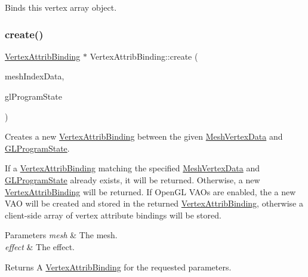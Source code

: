 Binds this vertex array object. \mbox{\label{classVertexAttribBinding_a9be9594764bc5cad1def711385dbb278}} 
\subsubsection{\texorpdfstring{create()}{create()}\hspace{0.1cm}{\footnotesize\ttfamily [1/2]}}
{\footnotesize\ttfamily \hyperlink{classVertexAttribBinding}{Vertex\+Attrib\+Binding} $\ast$ Vertex\+Attrib\+Binding\+::create (\begin{DoxyParamCaption}\item[{\hyperlink{classMeshIndexData}{Mesh\+Index\+Data} $\ast$}]{mesh\+Index\+Data,  }\item[{\hyperlink{classGLProgramState}{G\+L\+Program\+State} $\ast$}]{gl\+Program\+State }\end{DoxyParamCaption})\hspace{0.3cm}{\ttfamily [static]}}

Creates a new \hyperlink{classVertexAttribBinding}{Vertex\+Attrib\+Binding} between the given \hyperlink{classMeshVertexData}{Mesh\+Vertex\+Data} and \hyperlink{classGLProgramState}{G\+L\+Program\+State}.

If a \hyperlink{classVertexAttribBinding}{Vertex\+Attrib\+Binding} matching the specified \hyperlink{classMeshVertexData}{Mesh\+Vertex\+Data} and \hyperlink{classGLProgramState}{G\+L\+Program\+State} already exists, it will be returned. Otherwise, a new \hyperlink{classVertexAttribBinding}{Vertex\+Attrib\+Binding} will be returned. If Open\+GL V\+A\+Os are enabled, the a new V\+AO will be created and stored in the returned \hyperlink{classVertexAttribBinding}{Vertex\+Attrib\+Binding}, otherwise a client-\/side array of vertex attribute bindings will be stored.


\begin{DoxyParams}{Parameters}
{\em mesh} & The mesh. \\
\hline
{\em effect} & The effect.\\
\hline
\end{DoxyParams}
\begin{DoxyReturn}{Returns}
A \hyperlink{classVertexAttribBinding}{Vertex\+Attrib\+Binding} for the requested parameters. 
\end{DoxyReturn}
\mbox{\label{classVertexAttribBinding_ac0efc7ff6cca54db2e47d06db969ceeb}} 

